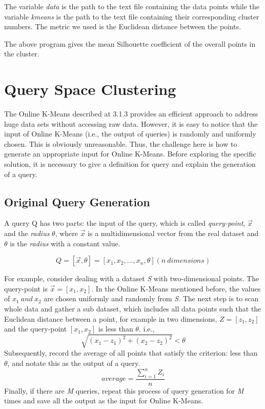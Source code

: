 \documentclass{lmproj}
\begin{document}
The variable \textit{data} is the path to the text file containing the data points while the variable \textit{kmeans} is the path to the text file containing their corresponding cluster numbers. The metric we used is the Euclidean distance between the points.


The above program gives the mean Silhouette coefficient of the overall points in the cluster.

\clearpage
\section{Query Space Clustering}

The Online K-Means described at 3.1.3 provides an efficient approach to address huge data sets without accessing raw data. However, it is easy to notice that the input of Online K-Means (i.e., the output of queries) is randomly and uniformly chosen. This is obviously unreasonable. Thus, the challenge here is how to generate an appropriate input for Online K-Means. Before exploring the specific solution, it is necessary to give a definition for query and explain the generation of a query. 

\subsection{Original Query Generation}

A query Q has two parts: the input of the query, which is called \textit{query-point}, $\vec{x} $ and the \textit{radius} $ \theta $, where $\vec{x} $ is a multidimensional vector from the real dataset and $ \theta $ is the \textit{radius} with a constant value. 

\begin{equation}
	Q =[\vec{x},\theta] =[x_1,x_2,...,x_n,\theta] (n\ dimensions)
\end{equation}

For example, consider dealing with a dataset \textit{S} with two-dimensional points. The query-point is $\vec{x} = [x_1,x_2] $. In the Online K-Means mentioned before, the values of $ x_1\ and\ x_2 $ are chosen uniformly and randomly from \textit{S}. The next step is to scan whole data and gather a sub dataset, which includes all data points such that the Euclidean distance between a point, for example in two dimensions, $ Z = [z_1,z_2]$ and the query-point $ [x_1,x_2] $ is less than  $ \theta $. i.e., $$ \sqrt{(x_1-z_1)^2 + (x_2-z_2)^2} < \theta $$ Subsequently, record the average of all points that satisfy the criterion: less than  $ \theta $, and notate this as the output of a query. $$ average = \frac{\sum_{i=1}^{n} Z_i}{n} $$ Finally, if there are \textit{M} queries, repeat this process of query generation for \textit{M} times and save all the output as the input for Online K-Means. 
\end{document}
